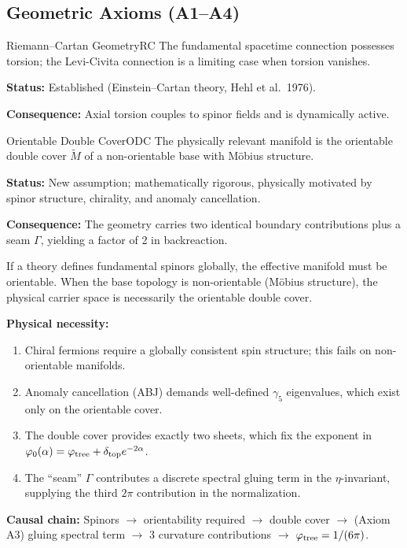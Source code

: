 \subsection{Geometric Axioms (A1--A4)}

\begin{axiom}{Riemann--Cartan Geometry}{RC}
The fundamental spacetime connection possesses torsion; the Levi-Civita 
connection is a limiting case when torsion vanishes.

\tcblower
\textbf{Status:} Established (Einstein--Cartan theory, Hehl et al.~1976).

\textbf{Consequence:} Axial torsion couples to spinor fields and is dynamically active.
\end{axiom}

\begin{axiom}{Orientable Double Cover}{ODC}
The physically relevant manifold is the orientable double cover $\widetilde{M}$ 
of a non-orientable base with M\"obius structure.

\tcblower
\textbf{Status:} New assumption; mathematically rigorous, physically motivated 
by spinor structure, chirality, and anomaly cancellation.

\textbf{Consequence:} The geometry carries two identical boundary contributions 
plus a seam $\Gamma$, yielding a factor of 2 in backreaction.
\end{axiom}

\begin{tcolorbox}[colback=blue!3, colframe=blue!40, title={\textbf{Lemma (Spin Structure Requires Orientability)}}, fonttitle=\bfseries\itshape]
If a theory defines fundamental spinors globally, the effective manifold must be 
orientable. When the base topology is non-orientable (M\"obius structure), the 
physical carrier space is necessarily the orientable double cover.

\textbf{Physical necessity:}
\begin{enumerate}[leftmargin=1.5em, topsep=2pt, itemsep=1pt]
    \item Chiral fermions require a globally consistent spin structure; this fails 
        on non-orientable manifolds.
    \item Anomaly cancellation (ABJ) demands well-defined $\gamma_5$ eigenvalues, 
        which exist only on the orientable cover.
    \item The double cover provides exactly two sheets, which fix the exponent in
        $\varphi_0(\alpha) = \varphi_{\mathrm{tree}} + \delta_{\mathrm{top}} e^{-2\alpha}$.
    \item The ``seam'' $\Gamma$ contributes a discrete spectral gluing term in the
        $\eta$-invariant, supplying the third $2\pi$ contribution in the normalization.
\end{enumerate}

\textbf{Causal chain:} Spinors $\to$ orientability required $\to$ double cover 
$\to$ (Axiom A3) gluing spectral term $\to$ 3 curvature contributions $\to$ $\varphi_{\mathrm{tree}} = 1/(6\pi)$.
\end{tcolorbox}

